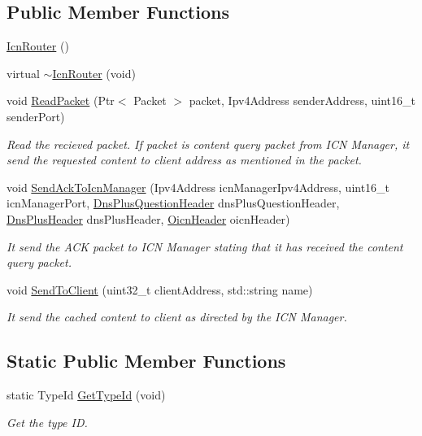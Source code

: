 \subsection*{Public Member Functions}
\begin{DoxyCompactItemize}
\item 
\hyperlink{classns3_1_1IcnRouter_a897987eb9c320461f49a23b1d7c98812}{Icn\-Router} ()
\item 
virtual \hyperlink{classns3_1_1IcnRouter_a52e01ead62ed2cf1d22ecba1e5c935f3}{$\sim$\-Icn\-Router} (void)
\item 
void \hyperlink{classns3_1_1IcnRouter_aee36cbcb810f960360aaf4a7efdcc237}{Read\-Packet} (Ptr$<$ Packet $>$ packet, Ipv4\-Address sender\-Address, uint16\-\_\-t sender\-Port)
\begin{DoxyCompactList}\small\item\em Read the recieved packet. If packet is content query packet from I\-C\-N Manager, it send the requested content to client address as mentioned in the packet. \end{DoxyCompactList}\item 
void \hyperlink{classns3_1_1IcnRouter_aaaf642b9d376e673288a2a5e28ac1b65}{Send\-Ack\-To\-Icn\-Manager} (Ipv4\-Address icn\-Manager\-Ipv4\-Address, uint16\-\_\-t icn\-Manager\-Port, \hyperlink{classns3_1_1DnsPlusQuestionHeader}{Dns\-Plus\-Question\-Header} dns\-Plus\-Question\-Header, \hyperlink{classns3_1_1DnsPlusHeader}{Dns\-Plus\-Header} dns\-Plus\-Header, \hyperlink{classns3_1_1OicnHeader}{Oicn\-Header} oicn\-Header)
\begin{DoxyCompactList}\small\item\em It send the A\-C\-K packet to I\-C\-N Manager stating that it has received the content query packet. \end{DoxyCompactList}\item 
void \hyperlink{classns3_1_1IcnRouter_ae0452d61162e9ce77690ecd06eff81d8}{Send\-To\-Client} (uint32\-\_\-t client\-Address, std\-::string name)
\begin{DoxyCompactList}\small\item\em It send the cached content to client as directed by the I\-C\-N Manager. \end{DoxyCompactList}\end{DoxyCompactItemize}
\subsection*{Static Public Member Functions}
\begin{DoxyCompactItemize}
\item 
static Type\-Id \hyperlink{classns3_1_1IcnRouter_af11ef09981ae023b6c9aaba3e1b02cb8}{Get\-Type\-Id} (void)
\begin{DoxyCompactList}\small\item\em Get the type I\-D. \end{DoxyCompactList}\end{DoxyCompactItemize}
